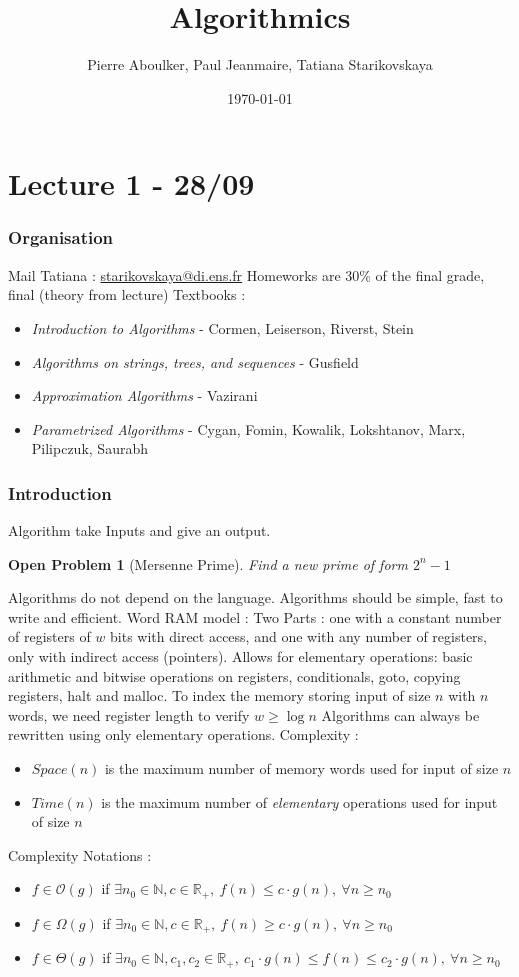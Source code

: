 \documentclass[12pt]{cours}
\title{Algorithmics}
\author{Pierre Aboulker, Paul Jeanmaire, Tatiana Starikovskaya}
\date{\today}
\newtheorem{openpb}{Open Problem}
\begin{document}
\part[First Algorithms]{Lecture 1 - 28/09}
\localtableofcontents
\section{Organisation}
Mail Tatiana : \url{starikovskaya@di.ens.fr}
Homeworks are 30\% of the final grade, final (theory from lecture)
Textbooks :
\begin{itemize}
    \item \textsl{Introduction to Algorithms} - Cormen, Leiserson, Riverst, Stein
    \item \textsl{Algorithms on strings, trees, and sequences} - Gusfield
    \item \textsl{Approximation Algorithms} - Vazirani
    \item \textsl{Parametrized Algorithms} - Cygan, Fomin, Kowalik, Lokshtanov, Marx, Pilipczuk, Saurabh
\end{itemize}

\section{Introduction}
Algorithm take Inputs and give an output.
\begin{openpb}[Mersenne Prime]
    Find a new prime of form $2^{n} - 1$
\end{openpb}
Algorithms do not depend on the language. Algorithms should be simple, fast to write and efficient.
Word RAM model : Two Parts : one with a constant number of registers of $w$ bits with direct access, and one with any number of registers, only with indirect access (pointers).
Allows for elementary operations: basic arithmetic and bitwise operations on registers, conditionals, goto, copying registers, halt and malloc.
To index the memory storing input of size $n$ with $n$ words, we need register length to verify $w \geq \log n$
Algorithms can always be rewritten using only elementary operations.
Complexity :
\begin{itemize}
    \item $Space(n)$ is the maximum number of memory words used for input of size $n$
    \item $Time(n)$ is the maximum number of \textsl{elementary} operations used for input of size $n$
\end{itemize}
Complexity Notations :
\begin{itemize}
    \item $f \in \mathcal{O}(g)$ if $\exists n_0 \in \mathbb{N}, c \in \mathbb{R}_{+},\ f(n) \leq c \cdot g(n), \ \forall n \geq n_0$
    \item $f \in \Omega(g)$ if $\exists n_0 \in \mathbb{N}, c \in \mathbb{R}_{+},\ f(n) \geq c \cdot g(n), \ \forall n \geq n_0$
    \item $f \in \Theta(g)$ if $\exists n_0 \in \mathbb{N}, c_{1}, c_{2} \in \mathbb{R}_{+},\ c_{1} \cdot g(n) \leq f(n) \leq c_{2} \cdot g(n), \ \forall n \geq n_0$
\end{itemize}
\end{document}
